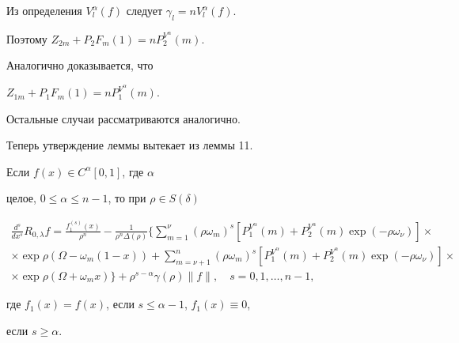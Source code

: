 \begin{pf}
Из определения $V_l^\alpha(f)$ следует $\gamma_l=n V_l^\alpha(f)$.


Поэтому $Z_{2m}+P_2F_m(1)=nP_2^{V^\alpha}(m)$.


Аналогично доказывается, что


$Z_{1m}+P_1F_m(1)=nP_1^{V^\alpha}(m)$.





Остальные случаи рассматриваются аналогично.





Теперь утверждение леммы вытекает из леммы 11.


\end{pf}





\begin{thm}


Если $f(x)\in C^\alpha[0,1]$, где $\alpha$


целое, $0\le\alpha\le n-1$, то при $\rho\in S(\delta)$


\begin{multline*}


\frac {d^s}{dx^s}R_{0,\lambda} f= \frac {f_1^{(s)}(x)}


{\rho^n}- \frac 1{\rho^n\Delta(\rho)}\bigg\{\sum\limits_{m=1}^{\nu}


(\rho\omega_m)^s[P_1^{V^\alpha}(m)+P_2^{V^\alpha}(m)\exp(-\rho


\omega_\nu)]\times \\


%


\times\exp\rho(\Omega-\omega_m(1-x))+


\sum\limits_{m=\nu+1}^n(\rho\omega_m)^s[P_1^{V^\alpha}(m)+


P_2^{V^\alpha}(m)\exp(-\rho\omega_\nu)]\times \\


%


\times\exp\rho(\Omega+


\omega_mx)\bigg\}+


\rho^{s-\alpha}\gamma(\rho)\|f\|,\quad s=0,1,\dotsc,n-1,


\end{multline*}


где $f_1(x)=f(x)$, если $s\le\alpha-1$, $f_1(x)\equiv0$,


если $s\ge\alpha$.


\end{thm}





